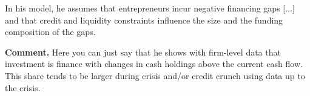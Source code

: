 \documentclass{article}
\begin{document}
{In his model, he assumes that entrepreneurs incur negative financing gaps [...] and that credit and liquidity constraints influence the size and the funding composition of the gaps. 

\textbf{Comment.} Here you can just say that he shows with firm-level data that investment is finance with changes in cash holdings above the current cash flow. This share tends to be larger during crisis and/or credit crunch using data up to the crisis.
















}
\end{document}
